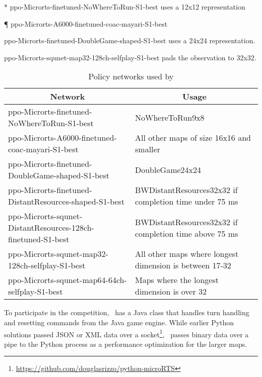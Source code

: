 \documentclass{article}
\begin{document}
\begin{table}[H]
\begin{threeparttable}
\begin{tablenotes}
                \item[*] ppo-Microrts-finetuned-NoWhereToRun-S1-best uses a 12x12
                representation
                \item[\P] ppo-Microrts-A6000-finetuned-coac-mayari-S1-best
                \item[\dag] ppo-Microrts-finetuned-DoubleGame-shaped-S1-best uses a 24x24
                    representation.
                \item[\ddag] ppo-Microrts-squnet-map32-128ch-selfplay-S1-best pads the
                    observation to 32x32.
            \end{tablenotes}
    \end{threeparttable}
\end{table}

\begin{table}[h]
    \caption{Policy networks used by \agentName}
    \label{tab:policy-networks}
    \begin{center}
        \begin{tabular}{|p{0.5\linewidth}|p{0.5\linewidth}|}
            \multicolumn{1}{c}{\bf Network}  &\multicolumn{1}{c}{\bf Usage} \\
            \hline
            ppo-Microrts-finetuned-NoWhereToRun-S1-best & NoWhereToRun9x8 \\ \hline
            ppo-Microrts-A6000-finetuned-coac-mayari-S1-best & All other maps of size 16x16 and smaller \\ \hline
            ppo-Microrts-finetuned-DoubleGame-shaped-S1-best & DoubleGame24x24 \\ \hline
            ppo-Microrts-finetuned-DistantResources-shaped-S1-best & BWDistantResources32x32 if completion time under 75 ms \\ \hline
            ppo-Microrts-squnet-DistantResources-128ch-finetuned-S1-best & BWDistantResources32x32 if completion time above 75 ms \\ \hline
            ppo-Microrts-squnet-map32-128ch-selfplay-S1-best & All other maps where longest dimension is between 17-32 \\ \hline
            ppo-Microrts-squnet-map64-64ch-selfplay-S1-best & Maps where the longest
            dimension is over 32 \\
            \hline
        \end{tabular}
    \end{center}
\end{table}

To participate in the competition, \agentName\ has a Java class that handles turn
handling and resetting commands from the Java game engine. While earlier Python
solutions  passed JSON or XML data over a
socket\footnote{\url{https://github.com/douglasrizzo/python-microRTS}}, \agentName\
passes binary data over a pipe to the Python process as a performance optimization for
the larger maps.
\end{document}
